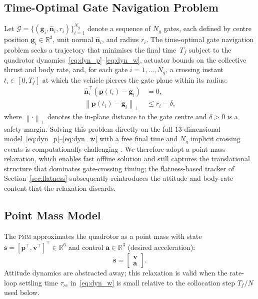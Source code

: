 \documentclass{ieeeaccess}
\newcommand{\R}{\mathbb{R}}
\newcommand{\norm}[1]{\left\| #1 \right\|}
\newcommand{\vect}[1]{\bm{#1}}
\newcommand{\pmm}{\textsc{pmm}}
\begin{document}
\subsection{Time-Optimal Gate Navigation Problem}
\label{sec:prob}

Let
$\mathcal{G}=\{(\vect{g}_i,\hat{\vect{n}}_i,r_i)\}_{i=1}^{N_g}$
denote a sequence of $N_g$ gates, each defined by centre position
$\vect{g}_i\in\R^3$, unit normal $\hat{\vect{n}}_i$, and radius $r_i$.
The time-optimal gate navigation problem seeks a trajectory that
minimises the final time~$T_f$ subject to the quadrotor
dynamics~\eqref{eq:dyn_p}--\eqref{eq:dyn_w}, actuator bounds on the
collective thrust and body rate, and, for each gate $i=1,\ldots,N_g$, a
crossing instant $t_i\in[0,T_f]$ at which the vehicle pierces the gate
plane within its radius:
%
\begin{align}
  \hat{\vect{n}}_i^\top(\vect{p}(t_i)-\vect{g}_i) &= 0,
  \label{eq:gate_plane}\\
  \norm{\vect{p}(t_i)-\vect{g}_i}_\perp &\leq r_i-\delta,
  \label{eq:gate_radius}
\end{align}
%
where $\norm{\cdot}_\perp$ denotes the in-plane distance to the gate
centre and $\delta>0$ is a safety margin.
Solving this problem directly on the full 13-dimensional
model~\eqref{eq:dyn_p}--\eqref{eq:dyn_w} with a free final time and
$N_g$ implicit crossing events is computationally challenging
\cite{foehn2021time}.
We therefore adopt a point-mass relaxation, which enables fast
offline solution and still captures the translational structure that
dominates gate-crossing timing; the flatness-based tracker of
Section~\ref{sec:flatness} subsequently reintroduces the attitude and
body-rate content that the relaxation discards.

\subsection{Point Mass Model}
\label{sec:pmm_model}

The \pmm{} approximates the quadrotor as a point mass with state
$\vect{s}=[\vect{p}^\top,\vect{v}^\top]^\top\in\R^6$ and control
$\vect{a}\in\R^3$ (desired acceleration):
\begin{equation}
  \dot{\vect{s}}=
  \begin{bmatrix}\vect{v}\\\vect{a}\end{bmatrix}.
  \label{eq:pmm_dyn}
\end{equation}
Attitude dynamics are abstracted away; this relaxation is valid when
the rate-loop settling time $\tau_{rc}$ in~\eqref{eq:dyn_w} is small
relative to the collocation step $T_f/N$ used below.
\end{document}
